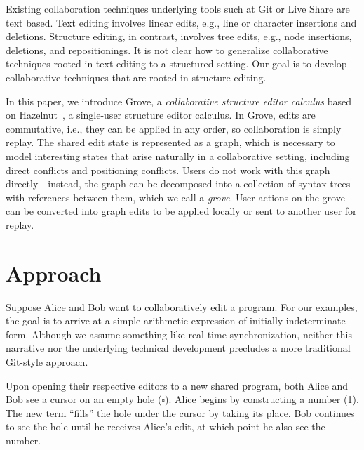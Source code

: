 \documentclass[nonacm, acmsmall, screen, review]{acmart}
\newcommand{\hole}{\ensuremath{\square}} %
\begin{document}
Existing collaboration techniques underlying tools such at Git or Live Share are text based.
Text editing involves linear edits, e.g., line or character insertions and deletions.
Structure editing, in contrast, involves tree edits, e.g., node insertions, deletions, and repositionings.
It is not clear how to generalize collaborative techniques rooted in text editing to a structured setting.
Our goal is to develop collaborative techniques that are rooted in structure editing.

In this paper, we introduce Grove, a \emph{collaborative structure editor calculus} based on Hazelnut~\cite{omar_hazelnut_2017}, a single-user structure editor calculus.
In Grove, edits are commutative, i.e., they can be applied in any order, so collaboration is simply replay.
The shared edit state is represented as a graph, which is necessary to model interesting states that arise naturally in a collaborative setting, 
including direct conflicts and positioning conflicts. 
Users do not work with this graph directly---instead, the graph can be decomposed into a collection of syntax trees with references between them, which we call a \emph{grove}.
User actions on the grove can be converted into graph edits to be applied locally or sent to another user for replay.



\section{Approach}

Suppose Alice and Bob want to collaboratively edit a program.
For our examples, the goal is to arrive at a simple arithmetic expression of initially indeterminate form.
Although we assume something like real-time synchronization,
neither this narrative nor the underlying technical development precludes a more traditional Git-style approach.

Upon opening their respective editors to a new shared program,
both Alice and Bob see a cursor on an empty hole ($\hole$).
Alice begins by constructing a number (1).
The new term ``fills'' the hole under the cursor by taking its place.
Bob continues to see the hole until he receives Alice's edit,
at which point he also see the number.
\end{document}
